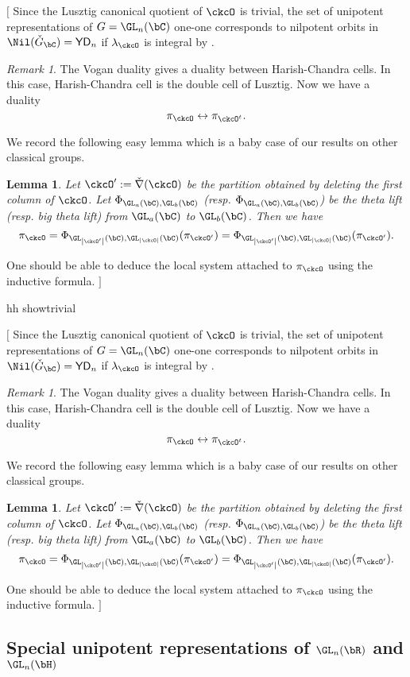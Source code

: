 \documentclass[12pt,a4paper]{amsart}
\newcommand{\trivial}[2][]{\if\relax\detokenize{#1}\relax
  {%
      \color{orange} \vspace{0em} $[$  #2 $]$
      \color{black}
  }
  \else
\ifx#1h
\ifcsname showtrivial\endcsname
{%
    \color{orange} \vspace{0em}  $[$ #2 $]$
    \color{black}
}
\fi
\else {\red Wrong argument!} \fi
\fi
}
\def\abs#1{\left|{#1}\right|}
\def\DDD{{\check\nabla}}
\numberwithin{equation}{section}
\newtheorem{lem}[thm]{Lemma}
\theoremstyle{remark}
\newtheorem{remark}[thm]{Remark}
\def\half{{\tfrac{1}{2}}}
\def\ckGc{\check{G}_{\bC}}
\def\YD{\mathsf{YD}}
\def\lamck{\lambda_\ckcO}
\def\DDD{{\check\nabla}}
\begin{document}


\trivial[h]{
Since the Lusztig canonical quotient of $\ckcO$ is trivial, the set of unipotent representations
of $G = \GL_n(\bC)$ one-one corresponds to nilpotent orbits in
$\Nil(\ckGc) = \YD_{n}$ if $\lamck$ is integral by
\cite{BVUni}.


\begin{remark}
The Vogan duality gives a duality between Harish-Chandra cells.
In this case, Harish-Chandra cell is the double cell
of Lusztig.
Now we have a duality
\[
 \pi_\ckcO \leftrightarrow \pi_{\ckcO^t}.
\]
\end{remark}

We record the following easy lemma which is a baby case of our results on other
classical groups.
\begin{lem}
  Let $\ckcO' := \DDD(\ckcO)$ be the partition obtained by deleting the first
  column of $\ckcO$. Let $\Phi_{\GL_{a}(\bC),\GL_{b}(\bC)}$ (resp.
  $\Phi_{\GL_{a}(\bC),\GL_{b}(\bC)}$) be the theta lift (resp. big theta lift)
  from $\GL_a(\bC)$ to $\GL_b(\bC)$. Then we have
  \[
    \pi_{\ckcO} = \Phi_{\GL_{\abs{\ckcO'}}(\bC),\GL_{\abs{\ckcO}}(\bC)} (\pi_{\ckcO'})= \Phi_{\GL_{\abs{\ckcO'}}(\bC),\GL_{\abs{\ckcO}}(\bC)} (\pi_{\ckcO'}).
  \]
\end{lem}

One should be able to deduce the local system attached to $\pi_{\ckcO}$ using
the inductive formula.
}

\subsection{Special unipotent representations of $\GL_n(\bR)$ and $\GL_n(\bH)$}\label{sec:GLRH}




\end{document}

